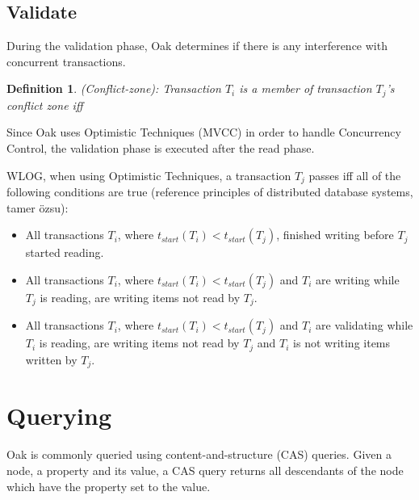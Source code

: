 \documentclass[abstracton,12pt]{scrreprt}
\newtheorem{definition}{Definition}
\begin{document}
\subsection{Validate}

During the validation phase, Oak determines if there is any interference with concurrent transactions.

\begin{definition}
    (Conflict-zone): Transaction $T_i$ is a member of transaction $T_j$'s conflict zone iff
\end{definition}

Since Oak uses Optimistic Techniques (MVCC) in order to handle Concurrency Control, the validation phase is executed after the read phase.

WLOG, when using Optimistic Techniques, a transaction $T_j$ passes iff all of the following conditions are true (reference principles of distributed database systems, tamer özsu):

\begin{itemize}
    \item All transactions $T_i$, where $t_{start}(T_i) < t_{start}(T_j)$, finished writing before $T_j$ started reading.
    \item All transactions $T_i$, where $t_{start}(T_i) < t_{start}(T_j)$ and $T_i$ are writing while $T_j$ is reading, are writing items not read by $T_j$.
    \item All transactions $T_i$, where $t_{start}(T_i) < t_{start}(T_j)$ and $T_i$ are validating while $T_i$ is reading, are writing items not read by $T_j$ and $T_i$ is not writing items written by $T_j$.
\end{itemize}

\section{Querying}

Oak is commonly queried using content-and-structure (CAS) queries.
Given a node, a property and its value, a CAS query returns all descendants of the node which have the property set to the value.

\end{document}
